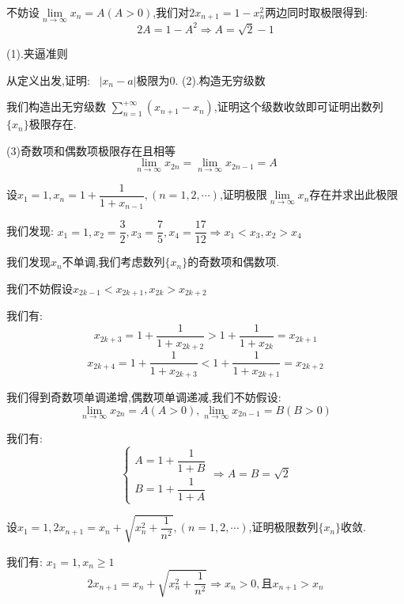 \begin{solution}
	不妨设$\lim\limits_{n\rightarrow\infty}x_{n}=A(A>0)$,我们对$2x_{n+1}=1-x_{n}^2$两边同时取极限得到: 
	$$2A=1-A^2\Rightarrow A=\sqrt{2}-1$$
	\begin{lemma}[不单调数列极限]
		(1).夹逼准则
		
		从定义出发,证明: \ $|x_{n}-a|$极限为$0$.
		(2).构造无穷级数
		
		我们构造出无穷级数 $\sum\limits_{n=1}^{+\infty}(x_{n+1}-x_{n})$,证明这个级数收敛即可证明出数列$\{x_{n}\}$极限存在.
		
		(3)奇数项和偶数项极限存在且相等
		$$\lim\limits_{n\rightarrow\infty}x_{2n}=\lim\limits_{n\rightarrow\infty}x_{2n-1}=A$$
	\end{lemma}
	\begin{proposition}
		设$x_{1}=1,x_{n}=1+\dfrac{1}{1+x_{n-1}},(n=1,2,\cdots)$,证明极限$\lim\limits_{n\rightarrow\infty}x_{n}$存在并求出此极限
	\end{proposition}
	\begin{solution}
		
		我们发现: $x_{1}=1,x_{2}=\dfrac{3}{2},x_{3}=\dfrac{7}{5},x_{4}=\dfrac{17}{12}\Rightarrow x_{1}<x_{3},x_{2}>x_{4}$
		
		我们发现$x_{n}$不单调,我们考虑数列$\{x_{n}\}$的奇数项和偶数项.
		
		我们不妨假设$x_{2k-1}<x_{2k+1},x_{2k}>x_{2k+2}$
		
		我们有: $$x_{2k+3}=1+\dfrac{1}{1+x_{2k+2}}>1+\dfrac{1}{1+x_{2k}}=x_{2k+1}$$
		$$x_{2k+4}=1+\dfrac{1}{1+x_{2k+3}}<1+\dfrac{1}{1+x_{2k+1}}=x_{2k+2}$$
		
		我们得到奇数项单调递增,偶数项单调递减,我们不妨假设: 
		$$\lim\limits_{n\rightarrow\infty}x_{2n}=A(A>0),\lim\limits_{n\rightarrow\infty}x_{2n-1}=B(B>0)$$
		
		我们有: 
		$$\left\lbrace 
		\begin{array}{l}
			A=1+\dfrac{1}{1+B}\\
			B=1+\dfrac{1}{1+A}
		\end{array}
		\right. \Rightarrow A=B=\sqrt{2}$$
	\end{solution}
	\begin{proposition}
		设$x_{1}=1,2x_{n+1}=x_{n}+\sqrt{x_{n}^2+\dfrac{1}{n^2}},(n=1,2,\cdots)$,证明极限数列$\{x_{n}\}$收敛.
	\end{proposition}
	\begin{solution}
		
		我们有: $x_{1}=1,x_{n}\geq 1$
		$$2x_{n+1}=x_{n}+\sqrt{x_{n}^2+\dfrac{1}{n^2}}\Rightarrow x_{n}>0,\text{且}x_{n+1}>x_{n}$$
		

\end{solution}
\end{solution}

